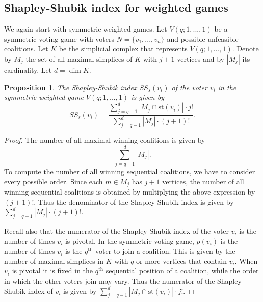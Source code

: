 \documentclass[11pt]{amsart}
\newcommand{\ifn}[1]{\footnote{{\bf Ismar: }#1}} %
\theoremstyle{plain}
\newtheorem{prop}[thm]{Proposition}
\theoremstyle{definition}
\theoremstyle{remark}
\begin{document}
\subsection{Shapley-Shubik index for weighted games}\label{SS:SS}
We again start with symmetric weighted games. Let $V(q;1,...,1)$ be a symmetric voting game with voters $N=\{v_1, ...,v_n\}$ and possible unfeasible coalitions. Let $K$ be the simplicial complex that represents $V(q;1,...,1)$. 
Denote by $M_j$ the set of all maximal simplices of $K$ with $j+1$ vertices and by $|M_j|$ its cardinality. Let $d=\dim K$. 
\begin{prop}
The Shapley-Shubik index $SS_s (v_i)$ of the voter $v_i$ in the symmetric weighted game $V(q;1,...,1)$ is given by
$$SS_s (v_i)=\frac{\sum_{j=q-1}^d |M_j \cap \text{st}(v_i)|\cdot j!}{\sum_{j=q-1}^d |M_j|\cdot (j+1)!}.$$
\end{prop}
\begin{proof}

The number of all maximal winning coalitions is given by
$$\sum_{j=q-1}^d |M_j|.$$
To compute the number of all winning sequential coalitions, we have to consider every possible order. Since each $m\in M_j$ has $j+1$ vertices, the number of all winning sequential coalitions is obtained by multiplying the above expression by $(j+1)!$. Thus the denominator of the Shapley-Shubik index is given by
$\sum_{j=q-1}^d |M_j|\cdot (j+1)!.$

Recall also that the numerator of the Shapley-Shubik index of the voter $v_i$ is the number of times $v_i$ is pivotal. In the symmetric voting game, $p(v_i)$ is the number of times $v_i$ is the $q^{\text{th}}$ voter to join a coalition. This is given by the number of maximal simplices in $K$ with $q$ or more vertices that contain $v_i$. When $v_i$ is pivotal it is fixed in the $q^{\text{th}}$ sequential position of a coalition, while the order in which the other voters join may vary. Thus the numerator of the Shapley-Shubik index of $v_i$ is given by
$\sum_{j=q-1}^d |M_j \cap \text{st}(v_i)|\cdot j!.$
%
%
\end{proof}
\end{document}
